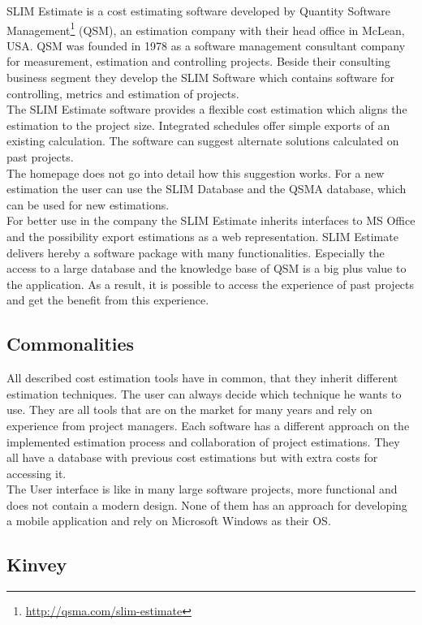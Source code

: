 SLIM Estimate is a cost estimating software developed by Quantity Software Management\footnote{\url{http://qsma.com/slim-estimate}} (QSM), an estimation company with their head office in McLean, USA. QSM was founded in 1978 as a software management consultant company for measurement, estimation and controlling projects. Beside their consulting business segment they develop the SLIM Software which contains software for controlling, metrics and estimation of projects.
\\
The SLIM Estimate software provides a flexible cost estimation which aligns the estimation to the project size. Integrated schedules offer simple exports of an existing calculation. The software can suggest alternate solutions calculated on past projects.
\\
The homepage does not go into detail how this suggestion works. For a new estimation the user can use the SLIM Database and the QSMA database, which can be used for new estimations.
\\
For better use in the company the SLIM Estimate inherits interfaces to MS Office and the possibility export estimations as a web representation. SLIM Estimate delivers hereby a software package with many functionalities. Especially the access to a large database and the knowledge base of QSM is a big plus value to the application. As a result, it is possible to access the experience of past projects and get the benefit from this experience.


\subsection{Commonalities}

All described cost estimation tools have in common, that they inherit different estimation techniques. The user can always decide which technique he wants to use. They are all tools that are on the market for many years and rely on experience from project managers. Each software has a different approach on the implemented estimation process and collaboration of project estimations. They all have a database with previous cost estimations but with extra costs for accessing it.\\
The User interface is like in many large software projects, more functional and does not contain a modern design. None of them has an approach for developing a mobile application and rely on Microsoft Windows as their OS.

\subsection{Kinvey}

